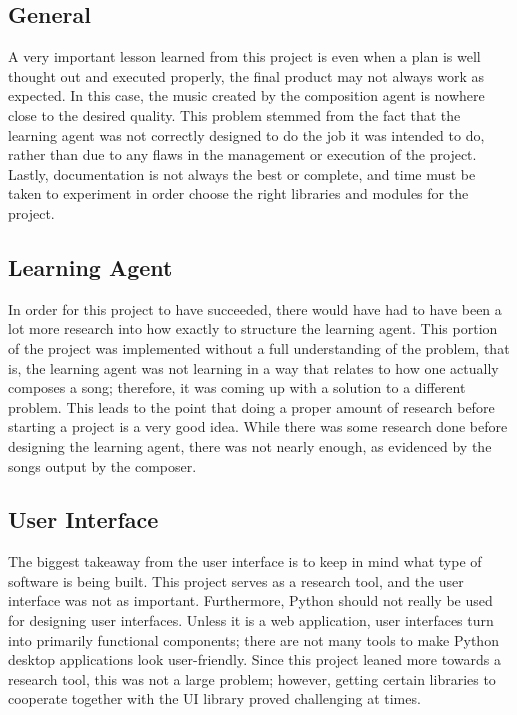 \documentclass{article}
\begin{document}
\subsection{General}
A very important lesson learned from this project is even when a plan is well thought out and executed properly, the final product may not always work as expected. In this case, the music created by the composition agent is nowhere close to the desired quality. This problem stemmed from the fact that the learning agent was not correctly designed to do the job it was intended to do, rather than due to any flaws in the management or execution of the project. Lastly, documentation is not always the best or complete, and time must be taken to experiment in order choose the right libraries and modules for the project. 

\subsection{Learning Agent}
In order for this project to have succeeded, there would have had to have been a lot more research into how exactly to structure the learning agent. This portion of the project was implemented without a full understanding of the problem, that is, the learning agent was not learning in a way that relates to how one actually composes a song; therefore, it was coming up with a solution to a different problem. This leads to the point that doing a proper amount of research before starting a project is a very good idea. While there was some research done before designing the learning agent, there was not nearly enough, as evidenced by the songs output by the composer. 

\subsection{User Interface}
The biggest takeaway from the user interface is to keep in mind what type of software is being built. This project serves as a research tool, and the user interface was not as important. Furthermore, Python should not really be used for designing user interfaces. Unless it is a web application, user interfaces turn into primarily functional components; there are not many tools to make Python desktop applications look user-friendly. Since this project leaned more towards a research tool, this was not a large problem; however, getting certain libraries to cooperate together with the UI library proved challenging at times.
\end{document}
